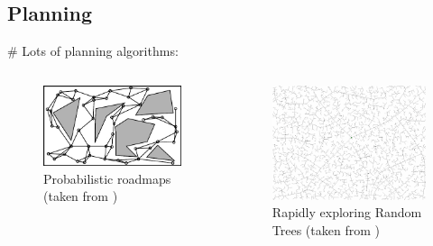 \documentclass[]{beamer}
\newcommand{\mSlideTitle}{{{\color{gray}\secname}} \# \subsecname}
\begin{document}
\subsection{Planning}
\begin{frame}{\mSlideTitle}
  Lots of planning algorithms:
  \begin{columns}[T,onlytextwidth]
      \begin{figure}
        \centering
        \includegraphics[width=\textwidth]{ProbRoadmap.jpg}
        \caption{Probabilistic roadmaps (taken from \cite{choset2005a})}
      \end{figure}
      \begin{figure}
        \centering
        \includegraphics[width=\textwidth]{RRT.png}
        \caption{Rapidly exploring Random Trees (taken from \cite{wikipedia_rrts_web})}
      \end{figure}
  \end{columns}
\end{frame}
\end{document}
